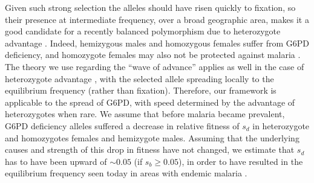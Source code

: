 \documentclass{article}
\begin{document}



Given such strong selection the alleles should have risen
quickly to fixation, so their presence at intermediate frequency,
over a broad geographic area, makes it a good candidate for a recently
balanced polymorphism due to heterozygote advantage \citep[note that
the conditions for a balanced polymorphism are
complicated by the hemizygosity of males, see][]{hedrick2011population, Pamillo:1979}. 
Indeed, hemizygous males and homozygous females suffer from G6PD deficiency,
and homozygote females may also not be protected against malaria \citep{manjurano_2015, malaria_network_2014}. 
The theory we use regarding the ``wave of advance'' \citep{fisher1937wave}
applies as well in the case of heterozygote advantage
\citep{aronson1975nonlinear}, with the selected allele spreading
locally to the equilibrium frequency (rather than fixation). 
Therefore, our framework is applicable to the spread of G6PD, with speed determined by the advantage of heterozygotes when rare.
We assume that before malaria became prevalent, 
G6PD deficiency alleles suffered a decrease in relative fitness of $s_d$ in heterozygote and homozygotes females and hemizygote males. 
Assuming that the underlying causes and strength of this drop in fitness have not changed, 
we estimate that $s_d$ has to have been upward of $\sim 0.05$ (if $s_b \geq 0.05$),
in order to have resulted in the equilibrium frequency seen today in
areas with endemic malaria \citep[based on heterozygote advantage
calculations for the X chromosome, results not shown, see also][]{Ruwende-g6pd}. 




\end{document}
